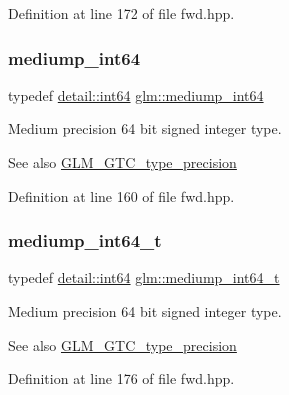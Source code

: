 Definition at line 172 of file fwd.\+hpp.

\mbox{\label{group__gtc__type__precision_ga603c695fe5cd677d3f72a81343e19a74}} 
\subsubsection{\texorpdfstring{mediump\_int64}{mediump\_int64}}
{\footnotesize\ttfamily typedef \mbox{\hyperlink{namespaceglm_1_1detail_a5b1c3227ec636c24a0676746381adfc8}{detail\+::int64}} \mbox{\hyperlink{group__gtc__type__precision_ga603c695fe5cd677d3f72a81343e19a74}{glm\+::mediump\+\_\+int64}}}

Medium precision 64 bit signed integer type. \begin{DoxySeeAlso}{See also}
\mbox{\hyperlink{group__gtc__type__precision}{G\+L\+M\+\_\+\+G\+T\+C\+\_\+type\+\_\+precision}} 
\end{DoxySeeAlso}


Definition at line 160 of file fwd.\+hpp.

\mbox{\label{group__gtc__type__precision_ga555a2f85641550c232db473a9bb981f7}} 
\subsubsection{\texorpdfstring{mediump\_int64\_t}{mediump\_int64\_t}}
{\footnotesize\ttfamily typedef \mbox{\hyperlink{namespaceglm_1_1detail_a5b1c3227ec636c24a0676746381adfc8}{detail\+::int64}} \mbox{\hyperlink{group__gtc__type__precision_ga555a2f85641550c232db473a9bb981f7}{glm\+::mediump\+\_\+int64\+\_\+t}}}

Medium precision 64 bit signed integer type. \begin{DoxySeeAlso}{See also}
\mbox{\hyperlink{group__gtc__type__precision}{G\+L\+M\+\_\+\+G\+T\+C\+\_\+type\+\_\+precision}} 
\end{DoxySeeAlso}


Definition at line 176 of file fwd.\+hpp.

\mbox{\label{group__gtc__type__precision_ga3ee8faab2278c44c5785af04b7b18a14}} 
